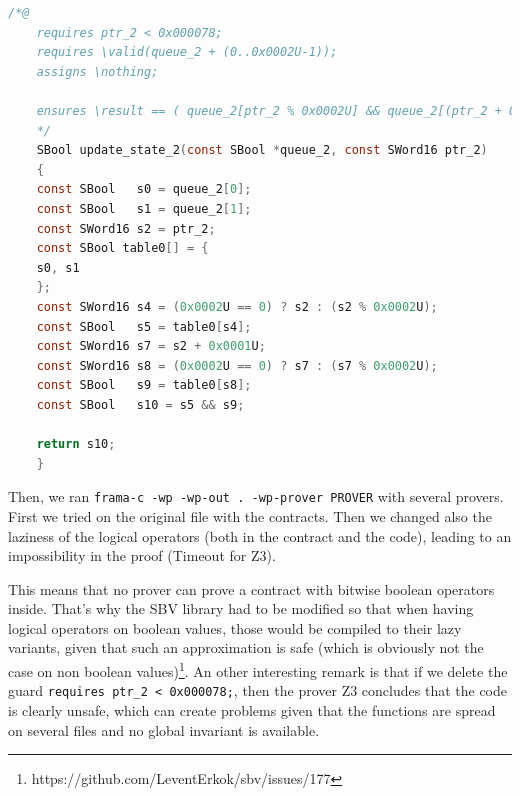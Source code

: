 \documentclass[a4paper,11pt,final]{article}
\begin{document}
	\begin{lstlisting}[language=C, keywordstyle=\color{blue}]
	/*@
	requires ptr_2 < 0x000078;
	requires \valid(queue_2 + (0..0x0002U-1));
	assigns \nothing;
	
	ensures \result == ( queue_2[ptr_2 % 0x0002U] && queue_2[(ptr_2 + 0x0001U) % 0x0002U]);
	*/
	SBool update_state_2(const SBool *queue_2, const SWord16 ptr_2)
	{
	const SBool   s0 = queue_2[0];
	const SBool   s1 = queue_2[1];
	const SWord16 s2 = ptr_2;
	const SBool table0[] = {
	s0, s1
	};
	const SWord16 s4 = (0x0002U == 0) ? s2 : (s2 % 0x0002U);
	const SBool   s5 = table0[s4];
	const SWord16 s7 = s2 + 0x0001U;
	const SWord16 s8 = (0x0002U == 0) ? s7 : (s7 % 0x0002U);
	const SBool   s9 = table0[s8];
	const SBool   s10 = s5 && s9;
	
	return s10;
	}
	\end{lstlisting}
	Then, we ran \texttt{frama-c -wp -wp-out . -wp-prover PROVER} with several provers. First we tried on the original file with the contracts. Then we changed also the laziness of the logical operators (both in the contract and the code), leading to an impossibility in the proof (Timeout for Z3). 
	
	This means that no prover can prove a contract with bitwise boolean operators inside. That's why the SBV library had to be modified so that when having logical operators on boolean values, those would be compiled to their lazy variants, given that such an approximation is safe (which is obviously not the case on non boolean values)\footnote{https://github.com/LeventErkok/sbv/issues/177}. An other interesting remark is that if we delete the guard \texttt{requires ptr\_2 < 0x000078;}, then the prover Z3 concludes that the code is clearly unsafe, which can create problems given that the functions are spread on several files and no global invariant is available. 
	
\end{document}
